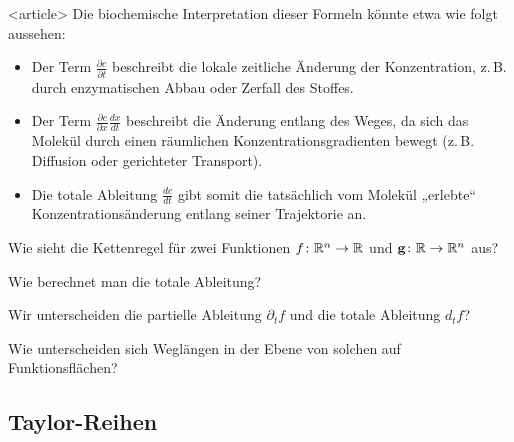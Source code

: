 \begin{onlyenv}<article>
Die biochemische Interpretation dieser Formeln könnte etwa wie folgt aussehen:
\begin{itemize}
\item Der Term \( \frac{\partial c}{\partial t} \) beschreibt die lokale zeitliche Änderung der Konzentration, z.\,B. durch enzymatischen Abbau oder Zerfall des Stoffes.
\item Der Term \( \frac{\partial c}{\partial x} \frac{dx}{dt} \) beschreibt die Änderung entlang des Weges, da sich das Molekül durch einen räumlichen Konzentrationsgradienten bewegt (z.\,B. Diffusion oder gerichteter Transport).
\item Die totale Ableitung \( \frac{dc}{dt} \) gibt somit die tatsächlich vom Molekül „erlebte“ Konzentrationsänderung entlang seiner Trajektorie an.
\end{itemize}
\end{onlyenv}

\begin{Abschluss}
\item Wie sieht die Kettenregel für zwei Funktionen
  $f\colon \mathbb R^n\to \mathbb R$ und $\mathbf{g}\colon \mathbb R \to \mathbb R^n$ aus?
\item Wie berechnet man die totale Ableitung?
\item Wir unterscheiden die partielle Ableitung $\partial_t f$ und die totale Ableitung $d_t f$?
\item Wie unterscheiden sich Weglängen in der Ebene von solchen auf \glqq{}Funktionsflächen\grqq{}?
\end{Abschluss}

\subsection{Taylor-Reihen}

